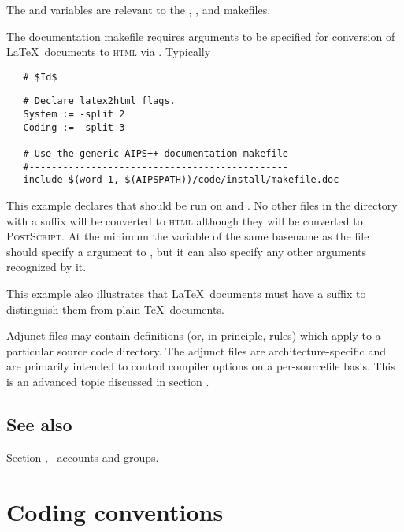\noindent
The  and  variables are relevant to the
, , and  makefiles.

The documentation makefile requires arguments to be specified for conversion
of \LaTeX\ documents to \textsc{html} via .  Typically

\noindent
\verb+   # $+\verb+Id$+

\begin{verbatim}
   # Declare latex2html flags.
   System := -split 2
   Coding := -split 3

   # Use the generic AIPS++ documentation makefile
   #----------------------------------------------
   include $(word 1, $(AIPSPATH))/code/install/makefile.doc
\end{verbatim}

\noindent
This example declares that  should be run on
 and .  No other files in the directory
with a  suffix will be converted to \textsc{html} although they
will be converted to \textsc{PostScript}.  At the minimum the variable of
the same basename as the  file should specify a 
argument to , but it can also specify any other arguments
recognized by it.

This example also illustrates that \LaTeX\ documents must have a 
suffix to distinguish them from plain \TeX\ documents.

Adjunct  files may contain definitions (or, in principle,
rules) which apply to a particular source code directory.  The adjunct files
are architecture-specific and are primarily intended to control compiler
options on a per-sourcefile basis.  This is an advanced topic discussed in
section .

\subsection*{See also}

Section , \aipspp\ accounts and groups.


\newpage
\section{Coding conventions}
\label{Coding conventions}

